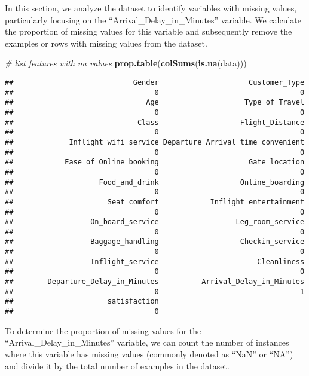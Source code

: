 \documentclass[
]{article}
\newenvironment{Shaded}{\begin{snugshade}}{\end{snugshade}}
\newcommand{\CommentTok}[1]{\textcolor[rgb]{0.56,0.35,0.01}{\textit{#1}}}
\newcommand{\FunctionTok}[1]{\textcolor[rgb]{0.13,0.29,0.53}{\textbf{#1}}}
\newcommand{\NormalTok}[1]{#1}
\begin{document}
In this section, we analyze the dataset to identify variables with
missing values, particularly focusing on the
``Arrival\_Delay\_in\_Minutes'' variable. We calculate the proportion of
missing values for this variable and subsequently remove the examples or
rows with missing values from the dataset.

\begin{Shaded}
\begin{Highlighting}[]
\CommentTok{\# list features with na values}
\FunctionTok{prop.table}\NormalTok{(}\FunctionTok{colSums}\NormalTok{(}\FunctionTok{is.na}\NormalTok{(data)))}
\end{Highlighting}
\end{Shaded}

\begin{verbatim}
##                            Gender                     Customer_Type 
##                                 0                                 0 
##                               Age                    Type_of_Travel 
##                                 0                                 0 
##                             Class                   Flight_Distance 
##                                 0                                 0 
##             Inflight_wifi_service Departure_Arrival_time_convenient 
##                                 0                                 0 
##            Ease_of_Online_booking                     Gate_location 
##                                 0                                 0 
##                    Food_and_drink                   Online_boarding 
##                                 0                                 0 
##                      Seat_comfort            Inflight_entertainment 
##                                 0                                 0 
##                  On_board_service                  Leg_room_service 
##                                 0                                 0 
##                  Baggage_handling                   Checkin_service 
##                                 0                                 0 
##                  Inflight_service                       Cleanliness 
##                                 0                                 0 
##        Departure_Delay_in_Minutes          Arrival_Delay_in_Minutes 
##                                 0                                 1 
##                      satisfaction 
##                                 0
\end{verbatim}

To determine the proportion of missing values for the
``Arrival\_Delay\_in\_Minutes'' variable, we can count the number of
instances where this variable has missing values (commonly denoted as
``NaN'' or ``NA'') and divide it by the total number of examples in the
dataset.
\end{document}
